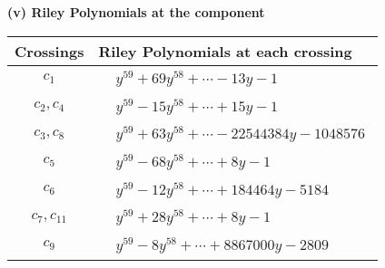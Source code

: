 \documentclass[1p]{elsarticle_modified}
\theoremstyle{definition}
\begin{document}
\newpage\renewcommand{\arraystretch}{1}
\flushleft \textbf{(v) Riley Polynomials at the component}\newline \\
\begin{tabular}{m{50pt}|m{274pt}}
Crossings & \hspace{64pt}Riley Polynomials at each crossing \\
\hline $$\begin{aligned}c_{1}\end{aligned}$$&$\begin{aligned}
&y^{59}+69 y^{58}+\cdots-13 y-1
\end{aligned}$\\
\hline $$\begin{aligned}c_{2},c_{4}\end{aligned}$$&$\begin{aligned}
&y^{59}-15 y^{58}+\cdots+15 y-1
\end{aligned}$\\
\hline $$\begin{aligned}c_{3},c_{8}\end{aligned}$$&$\begin{aligned}
&y^{59}+63 y^{58}+\cdots-22544384 y-1048576
\end{aligned}$\\
\hline $$\begin{aligned}c_{5}\end{aligned}$$&$\begin{aligned}
&y^{59}-68 y^{58}+\cdots+8 y-1
\end{aligned}$\\
\hline $$\begin{aligned}c_{6}\end{aligned}$$&$\begin{aligned}
&y^{59}-12 y^{58}+\cdots+184464 y-5184
\end{aligned}$\\
\hline $$\begin{aligned}c_{7},c_{11}\end{aligned}$$&$\begin{aligned}
&y^{59}+28 y^{58}+\cdots+8 y-1
\end{aligned}$\\
\hline $$\begin{aligned}c_{9}\end{aligned}$$&$\begin{aligned}
&y^{59}-8 y^{58}+\cdots+8867000 y-2809
\end{aligned}$\\

\end{tabular}
\end{document}
